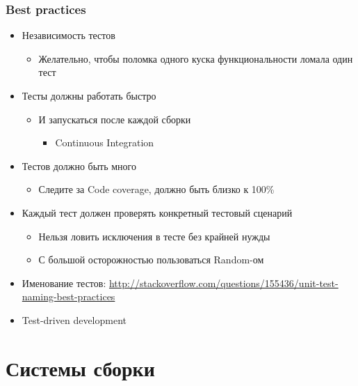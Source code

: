 \documentclass[xetex,mathserif,serif]{beamer}
\begin{document}
	\begin{frame}
		\frametitle{Best practices}
		\begin{itemize}
			\item Независимость тестов
			\begin{itemize}
				\item Желательно, чтобы поломка одного куска функциональности ломала один тест
			\end{itemize}
			\item Тесты должны работать быстро
			\begin{itemize}
				\item И запускаться после каждой сборки
				\begin{itemize}
					\item Continuous Integration
				\end{itemize}
			\end{itemize}
			\item Тестов должно быть много
			\begin{itemize}
				\item Следите за Code coverage, должно быть близко к 100\%
			\end{itemize}
			\item Каждый тест должен проверять конкретный тестовый сценарий
			\begin{itemize}
				\item Нельзя ловить исключения в тесте без крайней нужды
				\item С большой осторожностью пользоваться Random-ом
			\end{itemize}
			\item Именование тестов: \url{http://stackoverflow.com/questions/155436/unit-test-naming-best-practices}
			\item Test-driven development
		\end{itemize}
	\end{frame}

	\section{Системы сборки}
\end{document}

